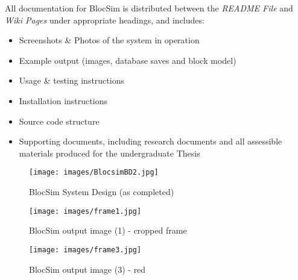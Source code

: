 All documentation for BlocSim is distributed between the \textit{README File} and \textit{Wiki Pages} under appropriate headings, and includes:
\begin{itemize}
\item Screenshots \& Photos of the system in operation
\item Example output (images, database saves and block model)
\item Usage \& testing instructions
\item Installation instructions
\item Source code structure
\item Supporting documents, including research documents and all assessible materials produced for the undergraduate Thesis
\end{itemize}





\begin{figure}[ht!]
\centering
\texttt{[image: images/BlocsimBD2.jpg]}
\caption{BlocSim System Design (as completed)}
\label{im:BlocsimBD2}
\end{figure}

\clearpage

\clearpage

\begin{figure}[ht!]
\centering
\texttt{[image: images/frame1.jpg]}
\caption{BlocSim output image (1) - cropped frame \cite{blocsim2014}}
\label{im:frame1}
\end{figure}

\begin{figure}[ht!]
\centering
\texttt{[image: images/frame3.jpg]}
\caption{BlocSim output image (3) - red \cite{blocsim2014}}
\label{im:frame3}
\end{figure}

